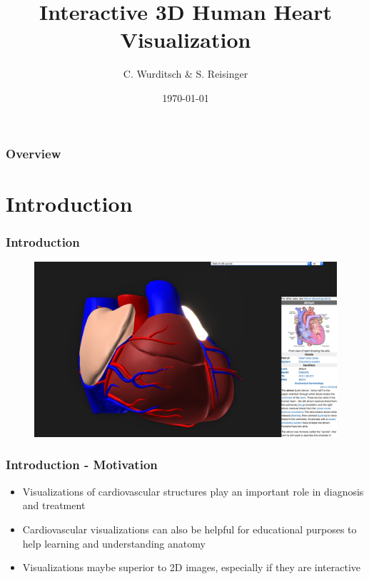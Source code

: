 \documentclass{beamer}
\title[Interactive 3D Human Heart Visualization]{Interactive 3D Human Heart Visualization} %
\author{C. Wurditsch \& S. Reisinger} %
\institute[VC+HCT’s] %
{
TU Wien \\ %
\medskip
\textit{} %
}
\date{\today} %
\begin{document}
\begin{frame}
\titlepage %
\end{frame}

\begin{frame}
\frametitle{Overview} %
\tableofcontents %
\end{frame}


\section{Introduction} 

\begin{frame}
\frametitle{Introduction}
\begin{figure}[h]
  \centering
  \includegraphics[width=0.9\linewidth]{../../screenshots/images/Wall_Of_Left_Auricle_highlighted.png}
\end{figure}
\end{frame}

\begin{frame}
\frametitle{Introduction - Motivation}
\begin{itemize}
    \item Visualizations of cardiovascular structures play an important role in diagnosis and treatment
    \item Cardiovascular visualizations can also be helpful for educational purposes to help learning and understanding anatomy
    \item Visualizations maybe superior to 2D images, especially if they are interactive
\end{itemize}
\end{frame}
\end{document}
